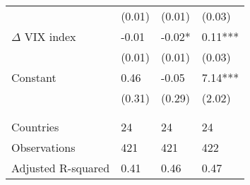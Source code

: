 {\begin{tabular}{lp{2cm}p{2cm}p{2cm}}
   & (0.01) & (0.01) & (0.03) \\ 
  $\Delta$ VIX index & -0.01 & -0.02* & 0.11*** \\ 
   & (0.01) & (0.01) & (0.03) \\ 
  Constant & 0.46 & -0.05 & 7.14*** \\ 
   & (0.31) & (0.29) & (2.02) \\ 
   &  &  &  \\ 
   &  &  &  \\ 
  Countries & 24 & 24 & 24 \\ 
  Observations & 421 & 421 & 422 \\ 
  Adjusted R-squared & 0.41 & 0.46 & 0.47 \\ 
   \hline
\end{tabular}
}
